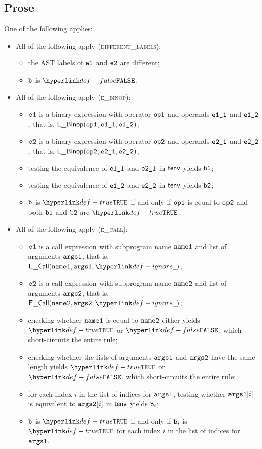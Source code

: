\documentclass{book}
\newcommand\ProseOrTypeError[0]{\ProseTerminateAs{\TypeErrorConfig}}
\begin{document}
\subsection{Prose}
One of the following applies:
\begin{itemize}
  \item All of the following apply (\textsc{different\_labels}):
  \begin{itemize}
    \item the AST labels of $\texttt{e1}$ and $\texttt{e2}$ are different;
    \item $\texttt{b}$ is $\False$.
  \end{itemize}

  \item All of the following apply (\textsc{e\_binop}):
  \begin{itemize}
    \item $\texttt{e1}$ is a binary expression with operator $\texttt{op1}$ and operands $\texttt{e1\_1}$ and $\texttt{e1\_2}$,
          that is, $\textsf{E\_Binop}(\texttt{op1}, \texttt{e1\_1}, \texttt{e1\_2})$;
    \item $\texttt{e2}$ is a binary expression with operator $\texttt{op2}$ and operands $\texttt{e2\_1}$ and $\texttt{e2\_2}$,
          that is, $\textsf{E\_Binop}(\texttt{op2}, \texttt{e2\_1}, \texttt{e2\_2})$;
    \item testing the equivalence of $\texttt{e1\_1}$ and $\texttt{e2\_1}$ in $\textsf{tenv}$ yields $\texttt{b1}$\ProseOrTypeError;
    \item testing the equivalence of $\texttt{e1\_2}$ and $\texttt{e2\_2}$ in $\textsf{tenv}$ yields $\texttt{b2}$\ProseOrTypeError;
    \item $\texttt{b}$ is $\True$ if and only if $\texttt{op1}$ is equal to $\texttt{op2}$ and both $\texttt{b1}$ and $\texttt{b2}$ are $\True$.
  \end{itemize}

  \item All of the following apply (\textsc{e\_call}):
  \begin{itemize}
    \item $\texttt{e1}$ is a call expression with subprogram name $\texttt{name1}$ and list of arguments $\texttt{args1}$,
          that is, $\ECall(\nameone, \vargsone, \Ignore)$;
    \item $\texttt{e2}$ is a call expression with subprogram name $\texttt{name2}$ and list of arguments $\texttt{args2}$,
          that is, $\ECall(\nametwo, \vargstwo, \Ignore)$;
    \item checking whether $\texttt{name1}$ is equal to $\texttt{name2}$ either yields $\True$ or $\False$, which short-circuits the entire rule;
    \item checking whether the lists of arguments $\texttt{args1}$ and $\texttt{args2}$ have the same length yields
          $\True$ or $\False$, which short-circuits the entire rule;
    \item for each index $i$ in the list of indices for $\texttt{args1}$, testing whether $\texttt{args1}[i]$ is equivalent to $\texttt{args2}[i]$
          in $\textsf{tenv}$ yields $\texttt{b}_i$\ProseOrTypeError;
    \item $\texttt{b}$ is $\True$ if and only if $\texttt{b}_i$ is $\True$ for each index $i$ in the list of indices for $\texttt{args1}$.
  \end{itemize}


\end{itemize}
\end{document}
